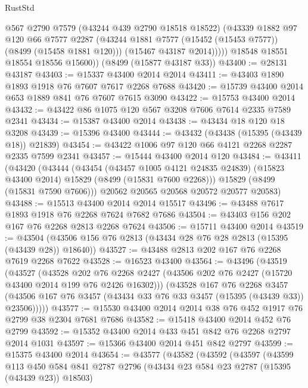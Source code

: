 \begin{lexlean}{RustStd}
\begin{coremodule}
              @567
              @2790
              @7579
              (@43244 @439 @2790 @18518 @18522)
              (@43339
                @1882
                @97
                @120
                @66
                @7577
                @2287
                (@43244 @1881 @7577 (@15452 (@15453 @7577)) (@8499 (@15458 @1881 @120)))
                (@15467 @43187 @2014)))))
        @18548
        @18551
        @18554
        @18556
        @15600))
    (@8499 (@15877 @43187 @33))
@43400 := @28131 @43187
@43403 := @15337 @43400 @2014 @2014
@43411 := @43403 @1890 @1893 @1918 @76 @7607 @7617 @2268 @7688
@43420 := @15739 @43400 @2014 @653 @1889 @841 @76 @7607 @7615 @3090
@43422 := @15753 @43400 @2014
@43432 := @43422 @86 @1075 @120 @567 @3208 @7606 @7614 @2335 @7589 @2341
@43434 := @15387 @43400 @2014
@43438 := @43434 @18 @120 @18 @3208
@43439 := @15396 @43400
@43444 := @43432 (@43438 (@15395 (@43439 @18)) @21839)
@43454 := @43422 @1006 @97 @120 @66 @4121 @2268 @2287 @2335 @7599 @2341
@43457 := @15444 @43400 @2014 @120
@43484 := @43411
    (@43420
      (@43444
        (@43454
          (@43457 @1005 @4121 @24835 @24839)
          (@15823 @43400 @2014)
          @15829
          (@8499 (@15831 @7600 @2268)))
        @15829
        (@8499 (@15831 @7590 @7606)))
      @20562
      @20565
      @20568
      @20572
      @20577
      @20583)
@43488 := @15513 @43400 @2014 @2014 @15517
@43496 := @43488 @7617 @1893 @1918 @76 @2268 @7624 @7682 @7686
@43504 := @43403 @156 @202 @167 @76 @2268 @2813 @2268 @7624
@43506 := @15711 @43400 @2014
@43519 := @43504 (@43506 @156 @76 @2813 (@43434 @28 @76 @28 @2813 (@15395 (@43439 @28)) @18640))
@43527 := @43488 @2813 @202 @167 @76 @2268 @7619 @2268 @7622
@43528 := @16523 @43400
@43564 := @43496
    (@43519
      (@43527
        (@43528
          @202
          @76
          @2268
          @2427
          (@43506 @202 @76 @2427 (@15720 @43400 @2014 @199 @76 @2426 @16302)))
        (@43528
          @167
          @76
          @2268
          @3457
          (@43506 @167 @76 @3457 (@43434 @33 @76 @33 @3457 (@15395 (@43439 @33)) @23506)))))
@43577 := @15530 @43400 @2014 @2014 @38 @76 @452 @1917 @76 @2799 @38 @2304 @7681 @7686
@43582 := @15418 @43400 @2014 @452 @76 @2799
@43592 := @15352 @43400 @2014 @433 @451 @842 @76 @2268 @2797 @2014 @1031
@43597 := @15366 @43400 @2014 @451 @842 @2797
@43599 := @15375 @43400 @2014
@43654 := @43577
    (@43582
      (@43592
        (@43597
          (@43599
            @113
            @450
            @584
            @841
            @2787
            @2796
            (@43434 @23 @584 @23 @2787 (@15395 (@43439 @23)) @18503)

\end{coremodule}
\end{lexlean}
